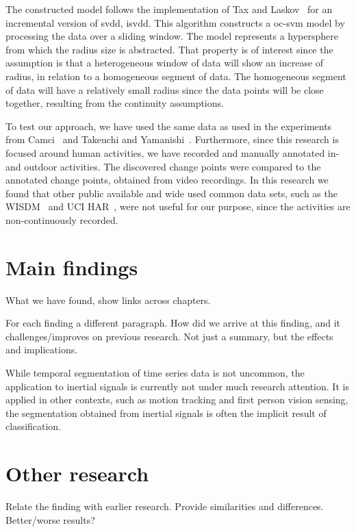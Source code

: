 The constructed model follows the implementation of Tax and Laskov~\cite{tax2003online} for an incremental version of \gls{svdd}, \gls{isvdd}.
This algorithm constructs a \gls{oc-svm} model by processing the data over a sliding window.
The model represents a hypersphere from which the radius size is abstracted.
That property is of interest since the assumption is that a heterogeneous window of data will show an increase of radius, in relation to a homogeneous segment of data.
The homogeneous segment of data will have a relatively small radius since the data points will be close together, resulting from the continuity assumptions.

To test our approach, we have used the same data as used in the experiments from Camci~\cite{camci2010change} and Takeuchi and Yamanishi~\cite{takeuchi2006unifying}.
Furthermore, since this research is focused around human activities, we have recorded and manually annotated in- and outdoor activities.
The discovered change points were compared to the annotated change points, obtained from video recordings.
In this research we found that other public available and wide used common data sets, such as the WISDM~\cite{kwapisz2011activity} and UCI HAR~\cite{anguita2012human}, were not useful for our purpose, since the activities are non-continuously recorded.




\section{Main findings}
What we have found, show links across chapters.

For each finding a different paragraph.
How did we arrive at this finding, and it challenges/improves on previous research.
Not just a summary, but the effects and implications.

While temporal segmentation of time series data is not uncommon, the application to inertial signals is currently not under much research attention.
It is applied in other contexts, such as motion tracking and first person vision sensing, the segmentation obtained from inertial signals is often the implicit result of classification.


\section{Other research}
Relate the finding with earlier research.
Provide similarities and differences.
Better/worse results?

